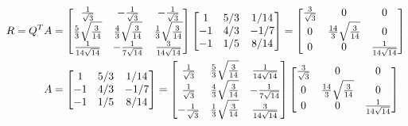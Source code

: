 \begin{align*}
    R=Q^TA & =\begin{bmatrix}
        \frac{1}{\sqrt{3}}              & -\frac{1}{\sqrt{3}}             & -\frac{1}{\sqrt{3}}             \\
        \frac{5}{3} \sqrt{\frac{3}{14}} & \frac{4}{3} \sqrt{\frac{3}{14}} & \frac{1}{3} \sqrt{\frac{3}{14}} \\
        \frac{1}{14\sqrt{14}}           & -\frac{1}{7\sqrt{14}}           & \frac{3}{14\sqrt{14}}
    \end{bmatrix}\begin{bmatrix}
        1  & 5/3 & 1/14 \\
        -1 & 4/3 & -1/7 \\
        -1 & 1/5 & 8/14
    \end{bmatrix}
    =\begin{bmatrix}
        \frac{3}{\sqrt{3}} & 0                               & 0                     \\
        0                  & \frac{14}{3}\sqrt{\frac{3}{14}} & 0                     \\
        0                  & 0                               & \frac{1}{14\sqrt{14}}
    \end{bmatrix}                                                                 \\
    A      & =\begin{bmatrix}
        1  & 5/3 & 1/14 \\
        -1 & 4/3 & -1/7 \\
        -1 & 1/5 & 8/14
    \end{bmatrix} =\begin{bmatrix}
        \frac{1}{\sqrt{3}}   & \frac{5}{3}\sqrt{\frac{3}{14}}  & \frac{1}{14\sqrt{14}} \\
        \-\frac{1}{\sqrt{3}} & \frac{4}{3} \sqrt{\frac{3}{14}} & -\frac{1}{7\sqrt{14}} \\
        -\frac{1}{\sqrt{3}}  & \frac{1}{3} \sqrt{\frac{3}{14}} & \frac{3}{14\sqrt{14}}
    \end{bmatrix} \begin{bmatrix}
        \frac{3}{\sqrt{3}} & 0                               & 0                     \\
        0                  & \frac{14}{3}\sqrt{\frac{3}{14}} & 0                     \\
        0                  & 0                               & \frac{1}{14\sqrt{14}}
    \end{bmatrix}
\end{align*}


